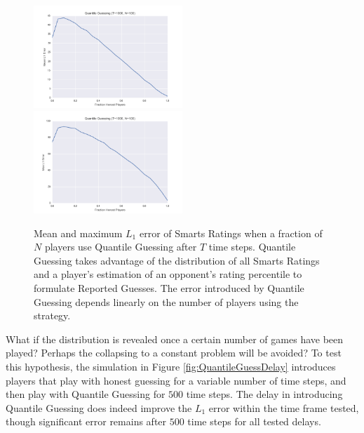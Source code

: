 \begin{figure}[H]
\centerline{%
\includegraphics[width=0.5\textwidth]{figures/robustness/Quantile_Guessing31.png}%
\includegraphics[width=0.5\textwidth] {figures/robustness/Quantile_Guessing32.png}%
}%
\caption{Mean and maximum $L_1$ error of Smarts Ratings when a fraction of $N$ players use Quantile Guessing after $T$ time steps. Quantile Guessing takes advantage of the distribution of all Smarts Ratings and a player's estimation of an opponent's rating percentile to formulate Reported Guesses. The error introduced by Quantile Guessing depends linearly on the number of players using the strategy.}
\label{fig:QuantileGuessFrac}
\end{figure}

What if the distribution is revealed once a certain number of games have been played? Perhaps the collapsing to a constant problem will be avoided? To test this hypothesis, the simulation in Figure \ref{fig:QuantileGuessDelay} introduces players that play with honest guessing for a variable number of time steps, and then play with Quantile Guessing for $500$ time steps. The delay in introducing Quantile Guessing does indeed improve the $L_1$ error within the time frame tested, though significant error remains after $500$ time steps for all tested delays. 

